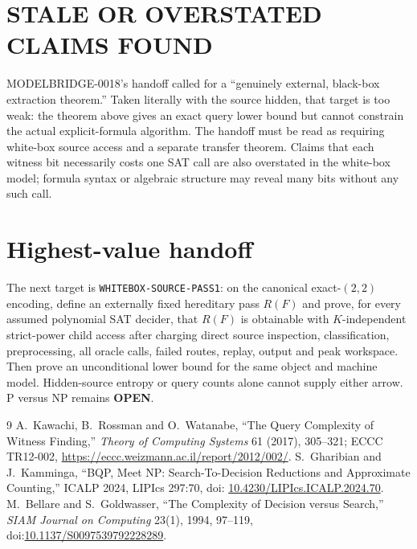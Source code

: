 \documentclass[11pt]{article}
\newcommand{\OPEN}{\textbf{OPEN}}
\begin{document}
\section{STALE OR OVERSTATED CLAIMS FOUND}

MODELBRIDGE-0018's handoff called for a ``genuinely external, black-box
extraction theorem.''  Taken literally with the source hidden, that target is
too weak: the theorem above gives an exact query lower bound but cannot
constrain the actual explicit-formula algorithm.  The handoff must be read as
requiring white-box source access and a separate transfer theorem.  Claims
that each witness bit necessarily costs one SAT call are also overstated in
the white-box model; formula syntax or algebraic structure may reveal many
bits without any such call.

\section{Highest-value handoff}

The next target is \texttt{WHITEBOX-SOURCE-PASS1}: on the canonical
exact-$(2,2)$ encoding, define an externally fixed hereditary pass $R(F)$ and
prove, for every assumed polynomial SAT decider, that $R(F)$ is obtainable
with $K$-independent strict-power child access after charging direct source
inspection, classification, preprocessing, all oracle calls, failed routes,
replay, output and peak workspace.  Then prove an unconditional lower bound
for the same object and machine model.  Hidden-source entropy or query counts
alone cannot supply either arrow.  P versus NP remains \OPEN.

\begin{thebibliography}{9}
A.~Kawachi, B.~Rossman and O.~Watanabe,
``The Query Complexity of Witness Finding,''
\emph{Theory of Computing Systems} 61 (2017), 305--321;
ECCC TR12-002, \url{https://eccc.weizmann.ac.il/report/2012/002/}.
S.~Gharibian and J.~Kamminga,
``BQP, Meet NP: Search-To-Decision Reductions and Approximate Counting,''
ICALP 2024, LIPIcs 297:70, doi:
\href{https://doi.org/10.4230/LIPIcs.ICALP.2024.70}{10.4230/LIPIcs.ICALP.2024.70}.
M.~Bellare and S.~Goldwasser,
``The Complexity of Decision versus Search,''
\emph{SIAM Journal on Computing} 23(1), 1994, 97--119,
doi:\href{https://doi.org/10.1137/S0097539792228289}{10.1137/S0097539792228289}.
\end{thebibliography}

\end{document}
